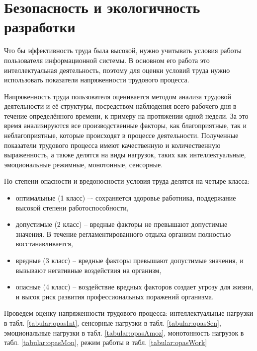 \section{Безопасность и экологичность разработки}
Что бы эффективность труда была высокой, нужно учитывать условия работы пользователя информационной системы. В основном его работа это интеллектуальная деятельность, поэтому для оценки условий труда нужно использовать показатели напряженности трудового процесса. 

Напряженность труда пользователя оценивается методом анализа трудовой деятельности и её структуры, посредством наблюдения всего рабочего дня в течение определённого времени, к примеру на протяжении одной недели. За это время анализируются все производственные факторы, как благоприятные, так и неблагоприятные, которые происходят в процессе деятельности. Полученные показатели трудового процесса имеют качественную и количественную выраженность, а также делятся на виды нагрузок, таких как интеллектуальные, эмоциональные режимные, монотонные, сенсорные. 

По степени опасности и вредоносности условия труда делятся на четыре класса:
\begin{itemize}
    \item оптимальные (1 класс) –- сохраняется здоровье работника, поддержание высокой степени работоспособности,
    \item допустимые (2 класс) -- вредные факторы не превышают допустимые значения. В течение регламентированного отдыха организм полностью восстанавливается,
    \item вредные (3 класс) -- вредные факторы превышают допустимые значения, и вызывают негативные воздействия на организм,
    \item опасные (4 класс) -- воздействие вредных факторов создает угрозу для жизни, и высок риск развития профессиональных поражений организма.
\end{itemize}

Проведем оценку напряженности трудового процесса: интеллектуальные нагрузки в табл. \ref{tabular:opasInt}, сенсорные нагрузки в табл. \ref{tabular:opasSen}, эмоциональные нагрузки в табл. \ref{tabular:opasAmoz}, монотонность нагрузок в табл. \ref{tabular:opasMon}, режим работы в табл. \ref{tabular:opasWork}

